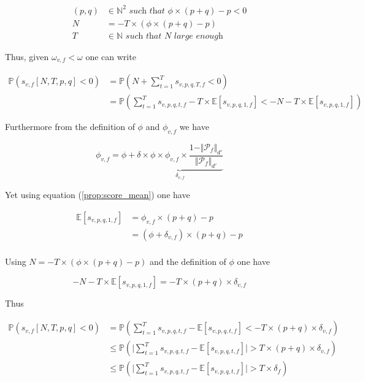 \documentclass[a4paper, 11pt]{article}
\begin{document}
\begin{align*}
(p, q) &\in \mathbb{N}^{2} \textit{ such that } \phi \times (p + q) - p < 0\\
N &= -T \times (\phi \times (p+q) - p)\\
T &\in \mathbb{N} \textit{ such that } N \textit{ large enough}
\end{align*}

Thus, given $\omega_{v,f}  < \omega$ one can write

\begin{align*}
\mathbb{P} \left( s_{v,f}[N, T, p, q] < 0 \right) &= \mathbb{P} \left( N + \sum_{t=1}^{T} s_{v, p, q, T, f} < 0 \right) \\
&= \mathbb{P}\left( \sum_{t=1}^{T} s_{v, p, q, t, f} - T \times \mathbb{E}\left[s_{v, p, q, 1, f}\right] < -N -  T \times \mathbb{E}\left[s_{v, p, q, 1, f}\right]\right)
\end{align*}

Furthermore from the definition of $\phi$ and $\phi_{v, f}$ we have

\begin{equation*}
\phi_{v, f} =\phi +  \underbrace{\delta \times \phi \times \phi_{v, f} \times \frac{1 - \Vert \mathcal{P}_{f} \Vert_{d'}}{\Vert \mathcal{P}_{f} \Vert_{d'}}}_{\delta_{v, f}}
\end{equation*}

Yet using equation (\ref{prop:score_mean}) one have

\begin{align*}
\mathbb{E}\left[s_{v, p, q, 1, f}\right] &= \phi_{v, f} \times (p + q) - p\\
&= (\phi + \delta_{v, f}) \times (p + q) - p\\
\end{align*}

Using $N = - T \times \left(\phi \times (p + q) - p \right)$ and the definition of $\phi$ one have

\begin{equation*}
-N -  T \times \mathbb{E}\left[s_{v, p, q, 1, f}\right] = -T \times (p + q) \times \delta_{v, f} 
\end{equation*}

Thus

\begin{align*}
\mathbb{P} \left( s_{v,f}[N, T, p, q] < 0 \right) &= \mathbb{P}\left( \sum_{t=1}^{T} s_{v, p, q, t, f} - \mathbb{E}\left[s_{v, p, q, t, f}\right] < -T \times (p + q) \times  \delta_{v, f} \right)\\
&\leq \mathbb{P}\left(\vert \sum_{t=1}^{T} s_{v, p, q,t, f} - \mathbb{E}\left[s_{v, p, q, t, f}\right] \vert > T \times (p + q) \times  \delta_{v, f} \right)\\
&\leq \mathbb{P}\left(\vert \sum_{t=1}^{T} s_{v, p, q, t, f} - \mathbb{E}\left[s_{v, p, q, t, f}\right] \vert > T \times \delta_{f} \right)
\end{align*}
\end{document}

